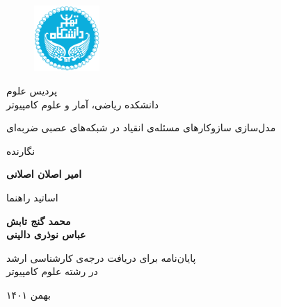 \documentclass[12pt]{report}
\begin{document}
	
	
	\begin{figure}
		\centering
		\includegraphics[height=2.5cm]{ut.png}
	\end{figure}
	
	\begin{center}
		پردیس علوم
		\\
		دانشکده ریاضی، آمار و علوم کامپیوتر
	\end{center}
	
	\begin{center}
	\end{center}
	
	\begin{center}
		\huge{مدل‌سازی سازوکارهای مسئله‌ی انقیاد در شبکه‌های عصبی ضربه‌ای}
	\end{center}
	
	\begin{center}
	\end{center}
	
	\begin{center}
		نگارنده
	\end{center}
	\begin{center}
		\textbf{
			امیر اصلان اصلانی
			\\[30pt]
		}
	\end{center}
	
	\begin{center}
		اساتید راهنما
	\end{center}
	\begin{center}
		\textbf{
			محمد گنج‌ تابش 
			\\[5pt]
			عباس نوذری دالینی
		}
	\end{center}
	
	\vspace{3cm}
	\begin{center}
		پایان‌نامه برای دریافت درجه‌ی کارشناسی ارشد
		\\
		در رشته علوم کامپیوتر
	\end{center}
	
	\begin{center}
		بهمن ۱۴۰۱
	\end{center}
	
\end{document}
